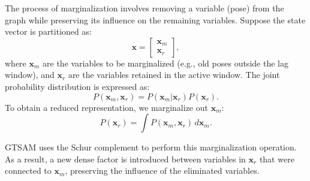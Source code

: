 The process of marginalization involves removing a variable (pose) from the graph while preserving its influence on the remaining variables. Suppose the state vector is partitioned as:
\begin{equation}
	\mathbf{x} = \begin{bmatrix} \mathbf{x}_m \\ \mathbf{x}_r \end{bmatrix},
\end{equation}
where \( \mathbf{x}_m \) are the variables to be marginalized (e.g., old poses outside the lag window), and \( \mathbf{x}_r \) are the variables retained in the active window. The joint probability distribution is expressed as:
\begin{equation}
	P(\mathbf{x}_m, \mathbf{x}_r) = P(\mathbf{x}_m | \mathbf{x}_r) P(\mathbf{x}_r).
\end{equation}
To obtain a reduced representation, we marginalize out \( \mathbf{x}_m \):
\begin{equation}
	P(\mathbf{x}_r) = \int P(\mathbf{x}_m, \mathbf{x}_r) \, d\mathbf{x}_m.
\end{equation}

GTSAM uses the Schur complement to perform this marginalization operation. As a result, a new dense factor is introduced between variables in \( \mathbf{x}_r \) that were connected to \( \mathbf{x}_m \), preserving the influence of the eliminated variables.

